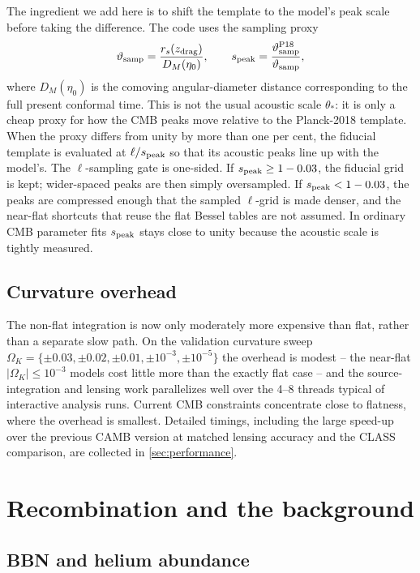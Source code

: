 \documentclass[prd, twocolumn, superscriptaddress, tightenlines, longbibliography, nofootinbib, eqsecnum, amsfonts, amsmath, floatfix, notitlepage]{revtex4-2}
\newcommand{\peakscale}{s_{\rm peak}}
\begin{document}
The ingredient we add here is to shift the template to the model's peak scale
before taking the difference. The code uses the sampling proxy
\begin{equation}
  \vartheta_{\rm samp}=\frac{r_s(z_{\rm drag})}{D_M(\eta_0)},\qquad
  \peakscale=\frac{\vartheta_{\rm samp}^{\rm P18}}{\vartheta_{\rm samp}},
\end{equation}
where \(D_M(\eta_0)\) is the comoving angular-diameter distance corresponding to
the full present conformal time. This is not the usual acoustic scale
\(\theta_*\): it is only a cheap proxy for how the CMB peaks move relative to the
Planck-2018 template. When the proxy differs from unity by more than one per
cent, the fiducial template is evaluated at \(\ell/\peakscale\) so that its
acoustic peaks line up with the model's. The \(\ell\)-sampling gate is one-sided.
If \(\peakscale\ge1-0.03\), the fiducial grid is kept;
wider-spaced peaks are then simply oversampled. If \(\peakscale<1-0.03\), the
peaks are compressed enough that the sampled \(\ell\)-grid is made denser, and the
near-flat shortcuts that reuse the flat Bessel tables are not assumed. In
ordinary CMB parameter fits \(\peakscale\) stays close to unity because the
acoustic scale is tightly measured.

\subsection{Curvature overhead}
\label{sec:bessel-curvature}

The non-flat integration is now only moderately more expensive than flat, rather
than a separate slow path. On the validation curvature sweep
$\Omega_K=\{\pm0.03,\pm0.02,\pm0.01,\pm10^{-3},\pm10^{-5}\}$ the overhead is
modest -- the near-flat $|\Omega_K|\le10^{-3}$ models cost little more than the
exactly flat case -- and the source-integration and lensing work parallelizes
well over the 4--8 threads typical of interactive analysis runs. Current CMB
constraints concentrate close to flatness, where the overhead is smallest.
Detailed timings, including the large speed-up over the previous \textsc{CAMB}
version at matched lensing accuracy and the \textsc{CLASS} comparison, are
collected in \cref{sec:performance}.

\section{Recombination and the background}
\label{sec:recomb}

\subsection{BBN and helium abundance}
\label{sec:bbn}
\end{document}
